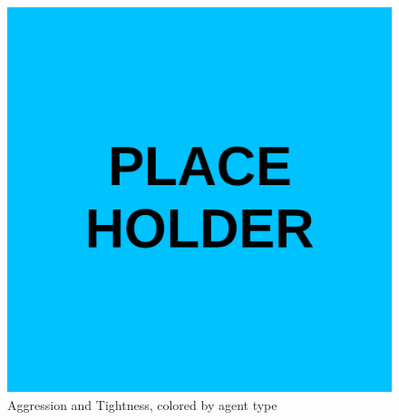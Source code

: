 \begin{figure}[H]
\centering
    \includegraphics[width=0.8\linewidth]{Results/figures/placeholder.png}
\caption{Aggression and Tightness, colored by agent type}
\label{AggTightAgentType}
\end{figure}

